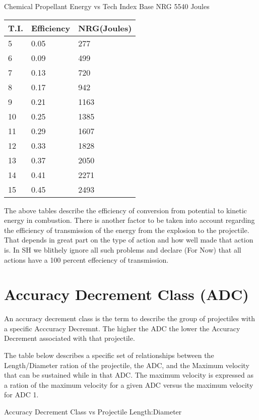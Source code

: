 Chemical Propellant Energy vs Tech Index
Base NRG     5540 Joules

\begin{tabular}{lll} \hline 
T.I.        & Efficiency      & NRG(Joules) \\ \hline 
5      		& 0.05            &   277 \\
6      		& 0.09            &   499 \\
7      		& 0.13            &   720 \\
8      		& 0.17            &   942 \\
9      		& 0.21           &   1163 \\
10     		& 0.25           &   1385 \\
11     		& 0.29           &   1607 \\
12     		& 0.33           &   1828 \\
13     		& 0.37           &   2050 \\
14     		& 0.41           &   2271 \\
15     		& 0.45           &   2493 \\ \hline 
\end{tabular}

The above tables describe the efficiency of conversion from 
potential to kinetic energy in combustion. There is another factor to 
be taken into account regarding the efficiency of transmission of the 
energy from the explosion to the projectile. That depends in great 
part on the type of action and how well made that action is. In SH we 
blithely ignore all such problems and declare (For Now) that all 
actions have a 100 percent effeciency of transmission.

\section{Accuracy Decrement Class (ADC)}

An accuracy decrement class is the term to describe the group of 
projectiles with a specific Acccuracy Decremnt. The higher the ADC the 
lower the Accuracy Decrement associated with that projectile. 

The table below describes a specific set of relationships between 
the Length/Diameter ration of the projectile, the ADC, and the 
Maximum velocity that can be sustained while in that ADC. The maximum 
velocity is expressed as a ration of the maximum velocity for a given 
ADC versus the maximum velocity for ADC 1. 


Accuracy Decrement Class vs Projectile Length:Diameter

